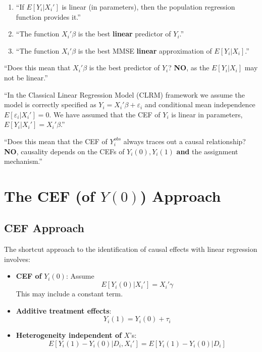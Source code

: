 \documentclass[
  letterpaper,
  DIV=11,
  numbers=noendperiod]{scrreprt}
\providecommand{\tightlist}{%
  \setlength{\itemsep}{0pt}\setlength{\parskip}{0pt}}\usepackage{longtable,booktabs,array}
\theoremstyle{definition}
\theoremstyle{remark}
\begin{document}
\begin{enumerate}
\def\labelenumi{\arabic{enumi}.}
\tightlist
\item
  ``If \(E[Y_i|X_i']\) is linear (in parameters), then the population
  regression function provides it.''
\item
  ``The function \(X_i'\beta\) is the best \textbf{linear} predictor of
  \(Y_i\).''
\item
  ``The function \(X_i'\beta\) is the best MMSE \textbf{linear}
  approximation of \(E[Y_i|X_i]\).''
\end{enumerate}

``Does this mean that \(X_i'\beta\) is the best predictor of \(Y_i\)?
\textbf{NO}, as the \(E[Y_i|X_i]\) may not be linear.''

``In the Classical Linear Regression Model (CLRM) framework we assume
the model is correctly specified as \(Y_i = X_i'\beta + \varepsilon_i\)
and conditional mean independence \(E[\varepsilon_i|X_i'] = 0\). We have
assumed that the CEF of \(Y_i\) is linear in parameters,
\(E[Y_i|X_i'] = X_i'\beta\).''

``Does this mean that the CEF of \(Y^{obs}_i\) always traces out a
causal relationship? \textbf{NO}, causality depends on the CEFs of
\(Y_i(0), Y_i(1)\) \textbf{and} the assignment mechanism.''


\chapter{\texorpdfstring{The CEF (of \(Y(0)\))
Approach}{The CEF (of Y(0)) Approach}}\label{the-cef-of-y0-approach}

\section{CEF Approach}\label{cef-approach}

The shortcut approach to the identification of causal effects with
linear regression involves:

\begin{itemize}
\item
  \textbf{CEF of} \(Y_i(0)\): Assume \[
  E[Y_i(0)|X_i'] = X_i'\gamma
  \] This may include a constant term.
\item
  \textbf{Additive treatment effects}: \[
  Y_i(1) = Y_i(0) + \tau_i
  \]
\item
  \textbf{Heterogeneity independent of} \(X\)'s: \[
  E[Y_i(1) - Y_i(0)|D_i,X_i'] = E[Y_i(1) - Y_i(0)|D_i]
  \]
\end{itemize}
\end{document}
